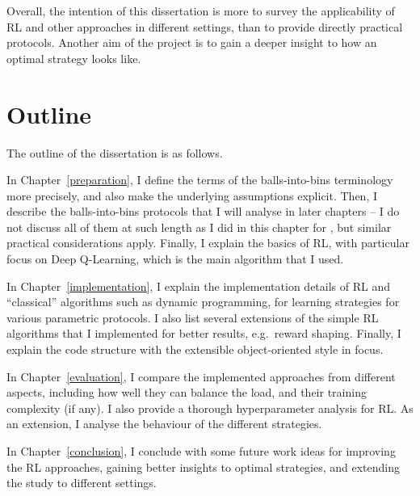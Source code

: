 Overall, the intention of this dissertation is more to survey the applicability of RL and other approaches in different settings, than to provide directly practical protocols. Another aim of the project is to gain a deeper insight to how an optimal strategy looks like.



\section{Outline}

The outline of the dissertation is as follows.


In Chapter~\ref{preparation}, I define the terms of the balls-into-bins terminology more precisely, and also make the underlying assumptions explicit. Then, I describe the balls-into-bins protocols that I will analyse in later chapters -- I do not discuss all of them at such length as I did in this chapter for \TwoThinning, but similar practical considerations apply. Finally, I explain the basics of RL, with particular focus on Deep Q-Learning, which is the main algorithm that I used.


In Chapter~\ref{implementation}, I explain the implementation details of RL and ``classical'' algorithms such as dynamic programming, for learning strategies for various parametric protocols. I also list several extensions of the simple RL algorithms that I implemented for better results, e.g.\ reward shaping. Finally, I explain the code structure with the extensible object-oriented style in focus.


In Chapter~\ref{evaluation}, I compare the implemented approaches from different aspects, including how well they can balance the load, and their training complexity (if any). I also provide a thorough hyperparameter analysis for RL. As an extension, I analyse the behaviour of the different strategies. 

In Chapter~\ref{conclusion}, I conclude with some future work ideas for improving the RL approaches, gaining better insights to optimal strategies, and extending the study to different settings.